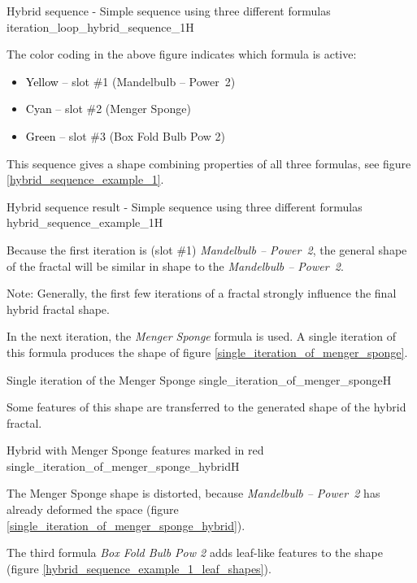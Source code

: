 {Hybrid sequence - Simple sequence using three different formulas}
{iteration_loop_hybrid_sequence_1}{H}

The color coding in the above figure indicates which formula is active:
\begin{itemize}
	\item \textcolor{yellow}{\textcolor{black}{Yellow}} -- slot \#1 (Mandelbulb -- Power~2)
	\item \textcolor{cyan}{\textcolor{black}{Cyan}} -- slot \#2 (Menger Sponge)
	\item \textcolor{green}{\textcolor{black}{Green}} -- slot \#3 (Box Fold Bulb Pow 2)
\end{itemize}

This sequence gives a shape combining properties of all three
formulas, see figure \ref{hybrid_sequence_example_1}.

{Hybrid sequence result - Simple sequence using three different formulas}
{hybrid_sequence_example_1}{H}

Because the first iteration is (slot \#1) \emph{Mandelbulb -- Power~2}, the general shape
of the fractal will be similar in shape to the \emph{Mandelbulb -- Power~2}.

Note: Generally, the first few iterations of a fractal strongly influence the final hybrid fractal shape.

In the next iteration, the \emph{Menger Sponge} formula is used. A single iteration
of this formula produces the shape of figure \ref{single_iteration_of_menger_sponge}.

{Single iteration of the Menger Sponge}
{single_iteration_of_menger_sponge}{H}

Some features of this shape are transferred to the generated shape of the hybrid fractal.

{Hybrid with Menger Sponge features marked in red}
{single_iteration_of_menger_sponge_hybrid}{H}

The Menger Sponge shape is distorted, because \emph{Mandelbulb -- Power~2} has
already deformed the space (figure \ref{single_iteration_of_menger_sponge_hybrid}).

The third formula \emph{Box Fold Bulb Pow 2} adds leaf-like features to the shape (figure \ref{hybrid_sequence_example_1_leaf_shapes}).

